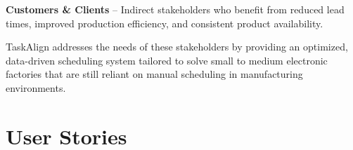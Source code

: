 \textbf{Customers \& Clients} – Indirect stakeholders who benefit from reduced lead times, improved production efficiency, and consistent product availability.

TaskAlign addresses the needs of these stakeholders by providing an optimized, data-driven scheduling system tailored to solve small to medium electronic factories that are still reliant on manual scheduling in manufacturing environments.


\section{User Stories}
\label{section:user-stories}


